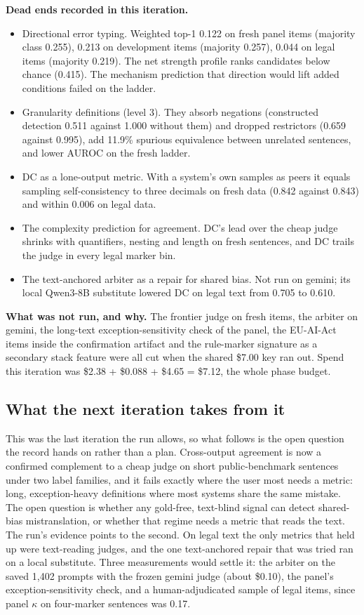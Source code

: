 \documentclass[11pt,letterpaper]{article}
\begin{document}
\textbf{Dead ends recorded in this iteration.}

\begin{itemize}
\item {}Directional error typing. Weighted top-1 0.122 on fresh panel items (majority class 0.255), 0.213 on development items (majority 0.257), 0.044 on legal items (majority 0.219). The net strength profile ranks candidates below chance (0.415). The mechanism prediction that direction would lift added conditions failed on the ladder.
\item {}Granularity definitions (level 3). They absorb negations (constructed detection 0.511 against 1.000 without them) and dropped restrictors (0.659 against 0.995), add 11.9\% spurious equivalence between unrelated sentences, and lower AUROC on the fresh ladder.
\item {}DC as a lone-output metric. With a system's own samples as peers it equals sampling self-consistency to three decimals on fresh data (0.842 against 0.843) and within 0.006 on legal data.
\item {}The complexity prediction for agreement. DC's lead over the cheap judge shrinks with quantifiers, nesting and length on fresh sentences, and DC trails the judge in every legal marker bin.
\item {}The text-anchored arbiter as a repair for shared bias. Not run on gemini; its local Qwen3-8B substitute lowered DC on legal text from 0.705 to 0.610.
\end{itemize}
\textbf{What was not run, and why.} The frontier judge on fresh items, the arbiter on gemini, the long-text exception-sensitivity check of the panel, the EU-AI-Act items inside the confirmation artifact and the rule-marker signature as a secondary stack feature were all cut when the shared \$7.00 key ran out. Spend this iteration was \$2.38 + \$0.088 + \$4.65 = \$7.12, the whole phase budget.

\subsection{What the next iteration takes from it}

This was the last iteration the run allows, so what follows is the open question the record hands on rather than a plan. Cross-output agreement is now a confirmed complement to a cheap judge on short public-benchmark sentences under two label families, and it fails exactly where the user most needs a metric: long, exception-heavy definitions where most systems share the same mistake. The open question is whether any gold-free, text-blind signal can detect shared-bias mistranslation, or whether that regime needs a metric that reads the text. The run's evidence points to the second. On legal text the only metrics that held up were text-reading judges, and the one text-anchored repair that was tried ran on a local substitute. Three measurements would settle it: the arbiter on the saved 1,402 prompts with the frozen gemini judge (about \$0.10), the panel's exception-sensitivity check, and a human-adjudicated sample of legal items, since panel $\kappa$ on four-marker sentences was 0.17.
\end{document}
